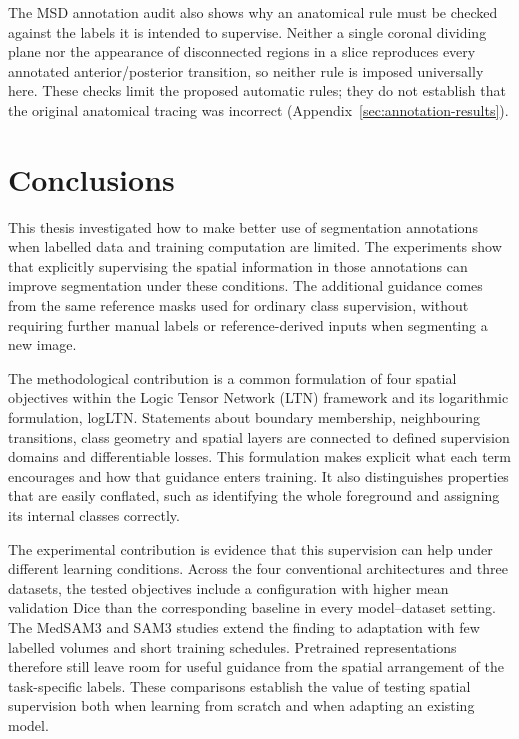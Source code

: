 \documentclass[12pt,a4paper]{article}
\begin{document}
The MSD annotation audit also shows why an anatomical rule must be checked
against the labels it is intended to supervise. Neither a single coronal
dividing plane nor the appearance of disconnected regions in a slice
reproduces every annotated anterior/posterior transition, so neither
rule is imposed universally here.
These checks limit the proposed automatic rules; they do not establish
that the original anatomical tracing was incorrect
(Appendix~\ref{sec:annotation-results}).

\clearpage

\section{Conclusions}\label{sec:conclusions}

This thesis investigated how to make better use of segmentation
annotations when labelled data and training computation are limited.
The experiments show that explicitly supervising the spatial information
in those annotations can improve segmentation under these conditions.
The additional guidance comes from the same reference masks used for
ordinary class supervision, without requiring further manual labels or
reference-derived inputs when segmenting a new image.

The methodological contribution is a common formulation of four spatial
objectives within the Logic Tensor Network (LTN) framework and its
logarithmic formulation, logLTN. Statements about boundary membership,
neighbouring transitions, class geometry and spatial layers are connected
to defined supervision domains and differentiable losses. This
formulation makes explicit what each term encourages and how that
guidance enters training. It also distinguishes properties that are
easily conflated, such as identifying the whole foreground and assigning
its internal classes correctly.

The experimental contribution is evidence that this supervision can help
under different learning conditions. Across the four conventional
architectures and three datasets, the tested objectives include a
configuration with higher mean validation Dice than the corresponding
baseline in every model--dataset setting. The MedSAM3 and SAM3 studies
extend the finding to adaptation with few labelled volumes and short
training schedules. Pretrained representations therefore still leave
room for useful guidance from the spatial arrangement of the
task-specific labels. These comparisons establish the value of testing
spatial supervision both when learning from scratch and when adapting an
existing model.
\end{document}
